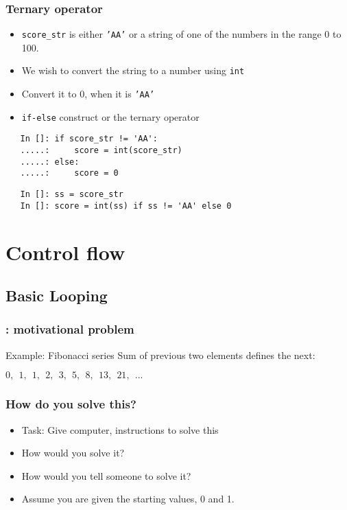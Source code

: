 \documentclass[14pt,compress]{beamer}
\begin{document}
\begin{frame}[fragile]
  \frametitle{Ternary operator}
  \begin{itemize}
  \item \texttt{score\_str} is either \texttt{'AA'} or a string of one
    of the numbers in the range 0 to 100.
  \item We wish to convert the string to a number using \texttt{int}
  \item Convert it to 0, when it is \texttt{'AA'}
  \item \texttt{if-else} construct or the ternary operator
  \end{itemize}
  \begin{lstlisting}
   In []: if score_str != 'AA':
   .....:     score = int(score_str)
   .....: else:
   .....:     score = 0
  \end{lstlisting}
  \begin{lstlisting}
   In []: ss = score_str
   In []: score = int(ss) if ss != 'AA' else 0
  \end{lstlisting}
\end{frame}


\section{Control flow}
\subsection{Basic Looping}

\begin{frame}
  \frametitle{: motivational problem}
\begin{block}{Example: Fibonacci series}
  Sum of previous two elements defines the next:
  \begin{center}
    $0,\ \ 1,\ \ 1,\ \ 2,\ \ 3,\ \ 5,\ \ 8,\ \ 13,\ \ 21,\ \ ...$
  \end{center}
\end{block}
\end{frame}

\begin{frame}
  \frametitle{How do you solve this?}
  \begin{itemize}
  \item Task: Give computer, instructions to solve this
    \vspace*{2em}
  \item How would you solve it?
  \item How would you tell someone to solve it?
    \vspace*{1em}
  \item Assume you are given the starting values, 0 and 1.
  \end{itemize}

\end{frame}
\end{document}
